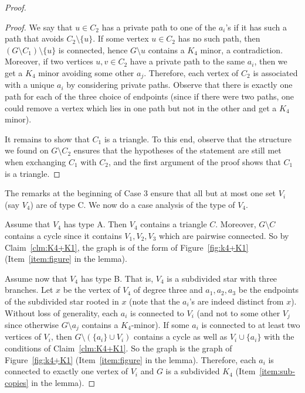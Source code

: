 \documentclass[a4paper,thm-restate,USenglish]{lipics-v2019}
\begin{document}
\begin{proof}
\begin{proof}
We say that $u\in C_2$ has a private path to one of the $a_i$'s if it has such a path that avoids $C_2\setminus\{u\}$. If some vertex $u\in C_2$ has no such path, then $(G\setminus C_1)\setminus\{u\}$ is connected, hence $G\setminus u$ contains a $K_4$ minor, a contradiction. 
Moreover, if two vertices $u,v\in C_2$ have a private path to the same $a_i$, then we get a $K_4$ minor avoiding some other $a_j$. Therefore, each vertex of $C_2$ is associated with a unique $a_i$ by considering private paths. Observe that there is exactly one path for each of the three choice of endpoints (since if there were two paths, one could remove a vertex which lies in one path but not in the other and get a $K_4$ minor). 

It remains to show that $C_1$ is a triangle. To this end, observe that the structure we found on $G\setminus C_2$ ensures that the hypotheses of the statement are still met when exchanging $C_1$ with $C_2$, and the first argument of the proof shows that $C_1$ is a triangle.
\end{proof}

The remarks at the beginning of Case 3 ensure that all but at most one set $V_i$ (say $V_4$) are of type C. We now do a case analysis of the type of $V_4$.

Assume that $V_4$ has type A. Then $V_4$ contains a triangle $C$. Moreover, $G \setminus C$ contains a cycle since it contains $V_1,V_2,V_3$ which are pairwise connected. So by Claim~\ref{clm:K4+K1}, the graph is of the form of Figure~\ref{fig:k4+K1} (Item~\ref{item:figure} in the lemma).

Assume now that $V_4$ has type B. That is, $V_4$ is a subdivided star with three branches. 
Let $x$ be the vertex of $V_4$ of degree three and $a_1,a_2,a_3$ be the endpoints of the subdivided star rooted in $x$ (note that the $a_i$'s are indeed distinct from $x$). 
Without loss of generality, each $a_i$ is connected to $V_i$ (and not to some other $V_j$ since otherwise $G\setminus a_j$ contains a $K_4$-minor). 
If some $a_i$ is connected to at least two vertices of $V_i$, then $G \setminus (\{ a_i \} \cup V_i)$ contains a cycle as well as $V_i \cup \{a_i \}$ with the conditions of Claim~\ref{clm:K4+K1}. So the graph is the graph of Figure~\ref{fig:k4+K1} (Item~\ref{item:figure} in the lemma).
Therefore, each $a_i$ is connected to exactly one vertex of $V_i$ and $G$ is a subdivided $K_4$ (Item~\ref{item:sub-copies} in the lemma). 


\end{proof}
\end{document}
